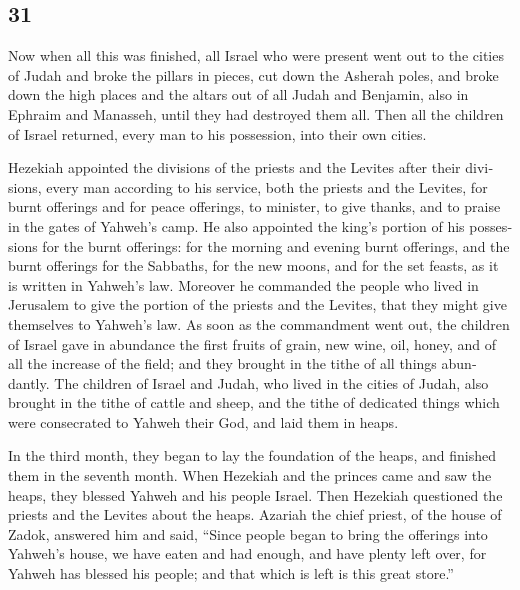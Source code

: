 \begin{paracol}{2}
\switchcolumn
\begin{otherlanguage}{english}

\hypertarget{section-61}{%
\section{31}\label{section-61}}

 Now when all this was finished, all Israel who were
present went out to the cities of Judah and broke the pillars in pieces,
cut down the Asherah poles, and broke down the high places and the
altars out of all Judah and Benjamin, also in Ephraim and Manasseh,
until they had destroyed them all. Then all the children of Israel
returned, every man to his possession, into their own cities.

 Hezekiah appointed the divisions of the priests and the
Levites after their divisions, every man according to his service, both
the priests and the Levites, for burnt offerings and for peace
offerings, to minister, to give thanks, and to praise in the gates of
Yahweh's camp.  He also appointed the king's portion of
his possessions for the burnt offerings: for the morning and evening
burnt offerings, and the burnt offerings for the Sabbaths, for the new
moons, and for the set feasts, as it is written in Yahweh's law.
 Moreover he commanded the people who lived in Jerusalem
to give the portion of the priests and the Levites, that they might give
themselves to Yahweh's law.  As soon as the commandment
went out, the children of Israel gave in abundance the first fruits of
grain, new wine, oil, honey, and of all the increase of the field; and
they brought in the tithe of all things abundantly.  The
children of Israel and Judah, who lived in the cities of Judah, also
brought in the tithe of cattle and sheep, and the tithe of dedicated
things which were consecrated to Yahweh their God, and laid them in
heaps.

 In the third month, they began to lay the foundation of
the heaps, and finished them in the seventh month.  When
Hezekiah and the princes came and saw the heaps, they blessed Yahweh and
his people Israel.  Then Hezekiah questioned the priests
and the Levites about the heaps.  Azariah the chief
priest, of the house of Zadok, answered him and said, ``Since people
began to bring the offerings into Yahweh's house, we have eaten and had
enough, and have plenty left over, for Yahweh has blessed his people;
and that which is left is this great store.''


\end{otherlanguage}
\end{paracol}
